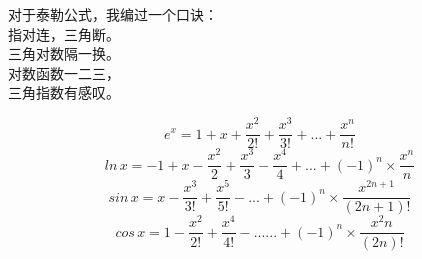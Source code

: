 \documentclass{article}
\begin{document}
 
	\begin{center}
	对于泰勒公式，我编过一个口诀：\\
		指对连，三角断。\\
		三角对数隔一换。\\
		对数函数一二三，\\
		三角指数有感叹。\\
	\end{center}

	
	$$
		e^x=1+x+\frac{x^2}{2!}+\frac{x^3}{3!}+...+\frac{x^n}{n!}
	$$
	$$
		ln\,  x=-1+x-\frac{x^2}{2}+\frac{x^3}{3}-\frac{x^4}{4}+...+(-1)^n\times\frac{x^n}{n}
    $$
	$$
		sin\, x=x-\frac{x^3}{3!}+\frac{x^5}{5!}-...+(-1)^n\times\frac{x^{2n+1}}{(2n+1)!}
	$$
	$$
	    cos\, x=1-\frac{x^2}{2!}+\frac{x^4}{4!}-......+(-1)^n\times\frac{x^2n}{(2n)!}
	$$
\end{document}
